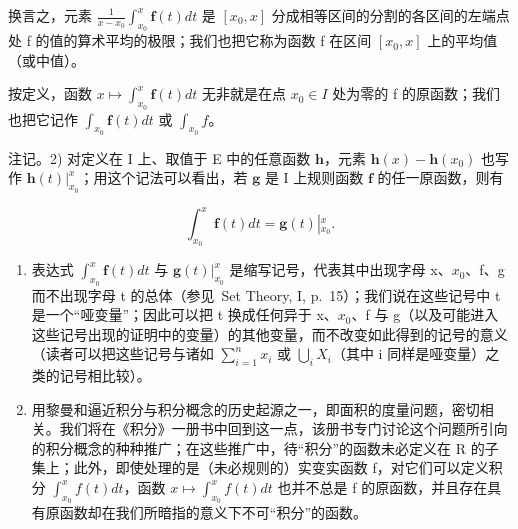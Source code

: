 换言之，元素 \(\frac{1}{x-x_{0}}\int_{x_{0}}^{x}\mathbf{f}(t)dt\) 是 \([x_{0},x]\) 分成相等区间的分割的各区间的左端点处 f 的值的算术平均的极限；我们也把它称为函数 f 在区间 \([x_{0},x]\) 上的平均值（或中值）。

按定义，函数 \(x \mapsto \int_{x_{0}}^{x} \mathbf{f}(t) dt\) 无非就是在点 \(x_{0} \in I\) 处为零的 f 的原函数；我们也把它记作 \(\int_{x_{0}} \mathbf{f}(t) dt\) 或 \(\int_{x_{0}} f\)。

注记。2) 对定义在 I 上、取值于 E 中的任意函数 \(\mathbf{h}\)，元素 \(\mathbf{h}(x) - \mathbf{h}(x_0)\) 也写作 \(\left.\mathbf{h}(t)\right|_{x_0}^x\)；用这个记法可以看出，若 \(\mathbf{g}\) 是 I 上规则函数 \(\mathbf{f}\) 的任一原函数，则有

\[
\int_ {x _ {0}} ^ {x} \mathbf {f} (t) d t = \mathbf {g} (t) \left| _ {x _ {0}} ^ {x}. \right.\tag{3}
\]

\begin{enumerate}
\def\labelenumi{\arabic{enumi})}
\setcounter{enumi}{2}
\item
  表达式 \(\int_{x_{0}}^{x}\mathbf{f}(t)dt\) 与 \(\mathbf{g}(t)\bigg|_{x_{0}}^{x}\) 是缩写记号，代表其中出现字母 x、\(x_{0}\)、f、g 而不出现字母 t 的总体（参见~Set Theory, I, p.~15）；我们说在这些记号中 t 是一个“哑变量”；因此可以把 t 换成任何异于 x、\(x_{0}\)、f 与 g（以及可能进入这些记号出现的证明中的变量）的其他变量，而不改变如此得到的记号的意义（读者可以把这些记号与诸如 \(\sum_{i=1}^{n}x_{i}\) 或 \(\bigcup_{i}X_{i}\)（其中 i 同样是哑变量）之类的记号相比较）。
\item
  用黎曼和逼近积分与积分概念的历史起源之一，即面积的度量问题，密切相关。我们将在《积分》一册书中回到这一点，该册书专门讨论这个问题所引向的积分概念的种种推广；在这些推广中，待“积分”的函数未必定义在 R 的子集上；此外，即使处理的是（未必规则的）实变实函数 f，对它们可以定义积分 \(\int_{x_{0}}^{x}f(t)dt\)，函数 \(x\mapsto\int_{x_{0}}^{x}f(t)dt\) 也并不总是 f 的原函数，并且存在具有原函数却在我们所暗指的意义下不可“积分”的函数。
\end{enumerate}
